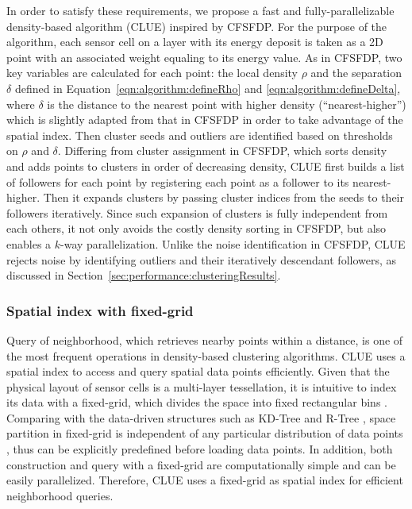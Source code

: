 In order to satisfy these requirements, we propose a fast and fully-parallelizable density-based algorithm (CLUE) inspired by CFSFDP. For the purpose of the algorithm, each sensor cell on a layer with its energy deposit is taken as a 2D point with an associated weight equaling to its energy value. As in CFSFDP, two key variables are calculated for each point: the local density $\rho$ and the separation $\delta$ defined in Equation~\ref{eqn:algorithm:defineRho} and \ref{eqn:algorithm:defineDelta}, where $\delta$ is the distance to the nearest point with higher density (``nearest-higher'') which is slightly adapted from that in CFSFDP in order to take advantage of the spatial index. Then cluster seeds and outliers are identified based on thresholds on $\rho$ and $\delta$. Differing from cluster assignment in CFSFDP, which sorts density and adds points to clusters in order of decreasing density, CLUE first builds a list of followers for each point by registering each point as a follower to its nearest-higher. Then it expands clusters by passing cluster indices from the seeds to their followers iteratively. Since such expansion of clusters is fully independent from each others, it not only avoids the costly density sorting in CFSFDP, but also enables a $k$-way parallelization. Unlike the noise identification in CFSFDP, CLUE rejects noise by identifying outliers and their iteratively descendant followers, as discussed in Section~\ref{sec:performance:clusteringResults}.


\subsubsection{Spatial index with fixed-grid}
Query of neighborhood, which retrieves nearby points within a distance, is one of the most frequent operations in density-based clustering algorithms. CLUE uses a spatial index to access and query spatial data points efficiently. Given that the physical layout of sensor cells is a multi-layer tessellation, it is intuitive to index its data with a fixed-grid, which divides the space into fixed rectangular bins \cite{bentley1979data,levinthal1966molecular}. Comparing with the data-driven structures such as KD-Tree \cite{Bentley:1975:MBS:361002.361007} and R-Tree \cite{Guttman:1984:RDI:971697.602266}, space partition in fixed-grid is independent of any particular distribution of data points \cite{rigaux2001spatial}, thus can be explicitly predefined before loading data points. In addition, both construction and query with a fixed-grid are computationally simple and can be easily parallelized. Therefore, CLUE uses a fixed-grid as spatial index for efficient neighborhood queries.


